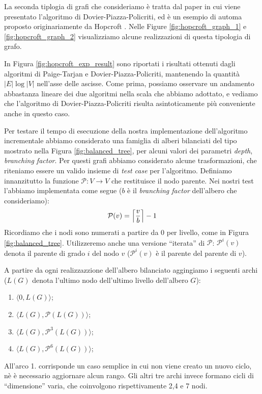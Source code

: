 La seconda tiplogia di grafi che consideriamo è tratta dal paper in cui viene presentato l'algoritmo di Dovier-Piazza-Policriti, ed è un esempio di automa proposto originariamente da Hopcroft \cite{hopcroft}. Nelle Figure \ref{fig:hopcroft_graph_1} e \ref{fig:hopcroft_graph_2} visualizziamo alcune realizzazioni di questa tipologia di grafo.

In Figura \ref{fig:hopcroft_exp_result} sono riportati i risultati ottenuti dagli algoritmi di Paige-Tarjan e Dovier-Piazza-Policriti, mantenendo la quantità $|E| \log |V|$ nell'asse delle ascisse. Come prima, possiamo osservare un andamento abbastanza lineare dei due algoritmi nella scala che abbiamo adottato, e vediamo che l'algoritmo di Dovier-Piazza-Policriti risulta asintoticamente più conveniente anche in questo caso.

Per testare il tempo di esecuzione della nostra implementazione dell'algoritmo incrementale abbiamo considerato una famiglia di alberi bilanciati del tipo mostrato nella Figura \ref{fig:balanced_tree}, per alcuni valori dei parametri \emph{depth}, \emph{branching factor}. Per questi grafi abbiamo considerato alcune trasformazioni, che riteniamo essere un valido insieme di \emph{test case} per l'algoritmo. Definiamo innanzitutto la funzione $\mathcal{P} : V \to V$ che restituisce il nodo parente. Nei nostri test l'abbiamo implementata come segue ($b$ è il \emph{branching factor} dell'albero che consideriamo):
\begin{gather*}
    \mathcal{P}(v) = \ceil[\Big]{\frac{v}{b}} - 1
\end{gather*}
Ricordiamo che i nodi sono numerati a partire da 0 per livello, come in Figura \ref{fig:balanced_tree}. Utilizzeremo anche una versione ``iterata'' di $\mathcal{P}$: $\mathcal{P}^i(v)$ denota il parente di grado $i$ del nodo $v$ ($\mathcal{P}^i(v)$ è il parente del parente di $v$).

A partire da ogni realizzazzione dell'albero bilanciato aggingiamo i seguenti archi ($L(G)$ denota l'ultimo nodo dell'ultimo livello dell'albero $G$):
\begin{enumerate}
    \item $\langle 0, L(G)\rangle$;
    \item $\langle L(G), \mathcal{P}(L(G))\rangle$;
    \item $\langle L(G), \mathcal{P}^3(L(G))\rangle$;
    \item $\langle L(G), \mathcal{P}^6(L(G))\rangle$;
\end{enumerate}
All'arco 1. corrisponde un caso semplice in cui non viene creato un nuovo ciclo, nè è necessario aggiornare alcun rango. Gli altri tre archi invece formano cicli di ``dimensione'' varia, che coinvolgono rispettivamente 2,4 e 7 nodi.

